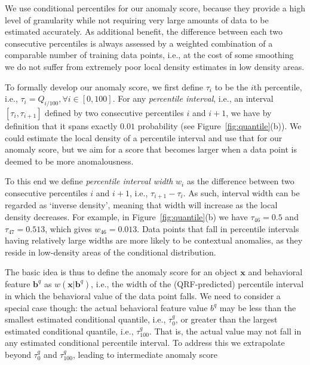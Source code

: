 \documentclass[pdflatex,sn-basic]{sn-jnl}%
\theoremstyle{thmstyleone}%
\theoremstyle{thmstyletwo}%
\theoremstyle{thmstylethree}%
\begin{document}
We use conditional percentiles for our anomaly score, because they provide a high level of granularity while not requiring very large amounts of data to be estimated accurately. 
As additional benefit, the difference between each two consecutive percentiles is always assessed by a weighted combination of a comparable number of training data points, i.e., at the cost of some smoothing we do not suffer from extremely poor local density estimates in low density areas.

To formally develop our anomaly score, we first define $\tau_i$ to be the $i$th percentile, i.e., $\tau_i = Q_{i/100}, \forall i \in [0,100]$. For any \emph{percentile interval}, i.e., an interval $[\tau_i, \tau_{i+1}]$ defined by two consecutive percentiles $i$ and $i+1$, we have by definition that it spans exactly $0.01$ probability (see Figure~\ref{fig:quantile}(b)). We could estimate the local density of a percentile interval and use that for our anomaly score, but we aim for a score that becomes larger when a data point is deemed to be more anomalousness. 

To this end we define \emph{percentile interval width} $w_i$ as the difference between two consecutive percentiles $i$ and $i+1$, i.e., $\tau_{i+1} - \tau_i$. As such, interval width can be regarded as `inverse density', meaning that width will increase as the local density decreases. For example, in Figure~\ref{fig:quantile}(b) we have $\tau_{46} = 0.5$ and $\tau_{47} = 0.513$, which gives $w_{46} = 0.013$. Data points that fall in percentile intervals having relatively large widths are more likely to be contextual anomalies, as they reside in low-density areas of the conditional distribution.

The basic idea is thus to define the anomaly score for an object $\mathbf{x}$ and behavioral feature $\mathbf{b}^{q}$ as $w(\mathbf{x}\rvert\mathbf{b}^{q})$, i.e., the width of the (QRF-predicted) percentile interval in which the behavioral value of the data point falls. We need to consider a special case though: the actual behavioral feature value $b^{q}$ may be less than the smallest estimated conditional quantile, i.e., $\tau_{0}^{q}$, or greater than the largest estimated conditional quantile, i.e., $\tau_{100}^{q}$. That is, the actual value may not fall in any estimated conditional percentile interval. To address this we extrapolate beyond $\tau_{0}^{q}$ and $\tau_{100}^{q}$, leading to intermediate anomaly score
\end{document}
